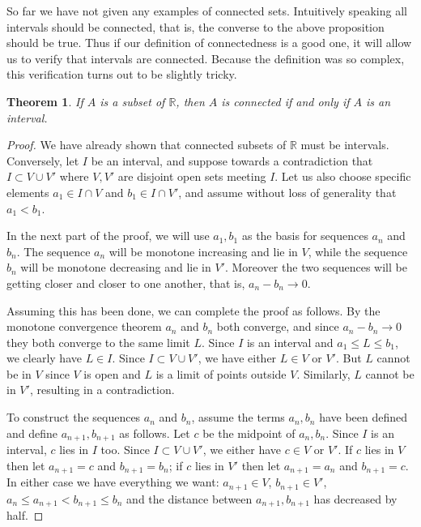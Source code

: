 \documentclass[11pt,oneside]{amsbook}
\newcommand{\R}{\mathbb R}
\theoremstyle{definition}
\theoremstyle{plain}
\newtheorem{theorem}{Theorem}[section]
\theoremstyle{definition}
\theoremstyle{remark}
\numberwithin{equation}{section}
\numberwithin{figure}{section}
\begin{document}
So far we have not given any examples of connected sets. Intuitively speaking all intervals should be connected, that is, the converse to the above proposition should be true. Thus if our definition of connectedness is a good one, it will allow us to verify that intervals are connected. Because the definition was so complex, this verification turns out to be slightly tricky.

\begin{theorem}
  If $A$ is a subset of $\R$, then $A$ is connected if and only if $A$ is an interval.
\end{theorem}

\begin{proof}
  We have already shown that connected subsets of $\R$ must be intervals. Conversely, let $I$ be an interval, and suppose towards a contradiction that $I\subset V\cup V'$ where $V,V'$ are disjoint open sets meeting $I$. Let us also choose specific elements $a_1\in I\cap V$ and $b_1\in I\cap V'$, and assume without loss of generality that $a_1<b_1$.

  In the next part of the proof, we will use $a_1,b_1$ as the basis for sequences $a_n$ and $b_n$. The sequence $a_n$ will be monotone increasing and lie in $V$, while the sequence $b_n$ will be monotone decreasing and lie in $V'$. Moreover the two sequences will be getting closer and closer to one another, that is, $a_n-b_n\to0$.

  Assuming this has been done, we can complete the proof as follows. By the monotone convergence theorem $a_n$ and $b_n$ both converge, and since $a_n-b_n\to0$ they both converge to the same limit $L$. Since $I$ is an interval and $a_1\leq L\leq b_1$, we clearly have $L\in I$. Since $I\subset V\cup V'$, we have either $L\in V$ or $V'$. But $L$ cannot be in $V$ since $V$ is open and $L$ is a limit of points outside $V$. Similarly, $L$ cannot be in $V'$, resulting in a contradiction.

  To construct the sequences $a_n$ and $b_n$, assume the terms $a_n,b_n$ have been defined and define $a_{n+1},b_{n+1}$ as follows. Let $c$ be the midpoint of $a_n,b_n$. Since $I$ is an interval, $c$ lies in $I$ too. Since $I\subset V\cup V'$, we either have $c\in V$ or $V'$. If $c$ lies in $V$ then let $a_{n+1}=c$ and $b_{n+1}=b_n$; if $c$ lies in $V'$ then let $a_{n+1}=a_n$ and $b_{n+1}=c$. In either case we have everything we want: $a_{n+1}\in V$, $b_{n+1}\in V'$, $a_n\leq a_{n+1}<b_{n+1}\leq b_n$ and the distance between $a_{n+1},b_{n+1}$ has decreased by half.
\end{proof}
\end{document}
